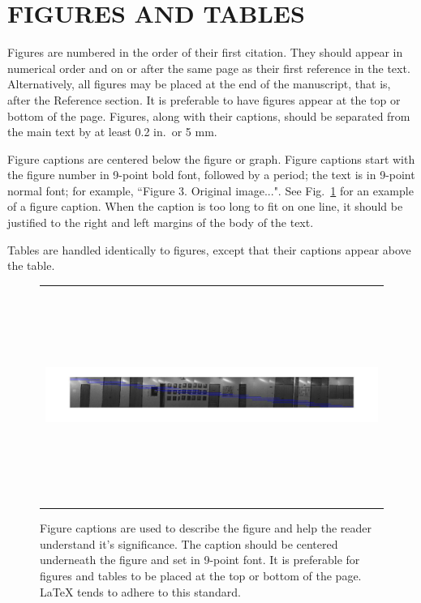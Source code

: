 \documentclass[]{spie}  %
\begin{document}
\section{FIGURES AND TABLES}

Figures are numbered in the order of their first citation.  They
should appear in numerical order and on or after the same page as
their first reference in the text.  Alternatively, all figures may be
placed at the end of the manuscript, that is, after the Reference
section.  It is preferable to have figures appear at the top or bottom
of the page.  Figures, along with their captions, should be separated
from the main text by at least 0.2 in.\ or 5 mm.

Figure captions are centered below the figure or graph.  Figure
captions start with the figure number in 9-point bold font, followed
by a period; the text is in 9-point normal font; for example,
``{\footnotesize{Figure 3.}  Original image...}".  See
Fig.~\ref{fig:example} for an example of a figure caption.  When the
caption is too long to fit on one line, it should be justified to the
right and left margins of the body of the text.

Tables are handled identically to figures, except that their captions
appear above the table.
\begin{figure}
  \begin{center}
    \begin{tabular}{c}
      \includegraphics[height=7cm]{naive.jpg}
    \end{tabular}
  \end{center}
  \caption[example]
  { \label{fig:example} Figure captions are used to describe the
    figure and help the reader understand it's significance.  The
    caption should be centered underneath the figure and set in
    9-point font.  It is preferable for figures and tables to be
    placed at the top or bottom of the page. LaTeX tends to adhere to
    this standard.}
\end{figure}
\end{document}
